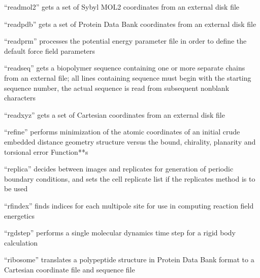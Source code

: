 \documentclass[letterpaper,11pt,english]{sphinxmanual}
\begin{document}
“readmol2” gets a set of Sybyl MOL2 coordinates from an external disk file


“readpdb” gets a set of Protein Data Bank coordinates from an external disk file


“readprm” processes the potential energy parameter file in order to define the default force field parameters


“readseq” gets a biopolymer sequence containing one or more separate chains from an external file; all lines containing sequence must begin with the starting sequence number, the actual sequence is read from subsequent nonblank characters


“readxyz” gets a set of Cartesian coordinates from an external disk file


“refine” performs minimization of the atomic coordinates of an initial crude embedded distance geometry structure versus the bound, chirality, planarity and torsional error Function**s



“replica” decides between images and replicates for generation of periodic boundary conditions, and sets the cell replicate list if the replicates method is to be used


“rfindex” finds indices for each multipole site for use in computing reaction field energetics



“rgdstep” performs a single molecular dynamics time step for a rigid body calculation


“ribosome” translates a polypeptide structure in Protein Data Bank format to a Cartesian coordinate file and sequence file

\end{document}
